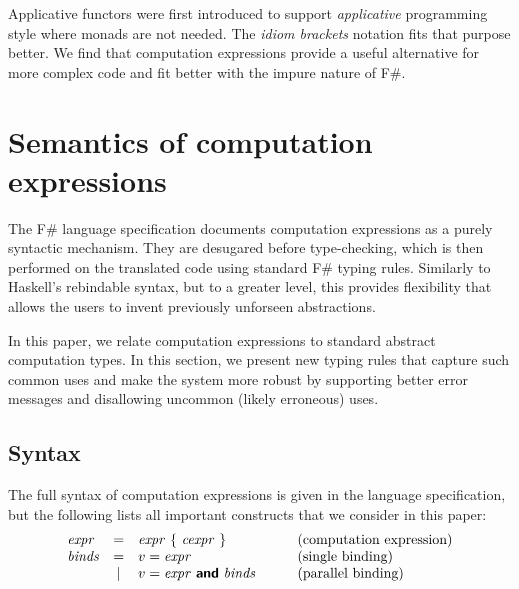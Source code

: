 \documentclass[runningheads,a4paper]{llncs}
\begin{document}
Applicative functors were first introduced to support \emph{applicative} programming style where
monads are not needed. The \emph{idiom brackets} notation \cite{applicative} fits that purpose better. We
find that computation expressions provide a useful alternative for more complex code and fit better 
with the impure nature of F\#.


\section{Semantics of computation expressions}
\label{sec:semantics}

The F\# language specification \cite{fsharp-spec} documents computation expressions as a purely syntactic 
mechanism. They are desugared before type-checking, which is then performed on the translated code 
using standard F\# typing rules. Similarly to Haskell's rebindable syntax, but to a greater level, 
this provides flexibility that allows the users to invent previously unforseen abstractions.

In this paper, we relate computation expressions to standard abstract computation types. In this
section, we present new typing rules that capture such common uses and make the system more robust 
by supporting better error messages and disallowing uncommon (likely erroneous) uses.


\subsection{Syntax}
\label{sec:semantics-syntax}

The full syntax of computation expressions is given in the language specification, but the following
lists all important constructs that we consider in this paper:
%
\begin{equation*}
\begin{array}{lclcl}
\expr  &=& \expr ~\{~ \cexpr ~\}                       &\quad&\textnormal{(computation expression)}\\
\binds &=& v=\expr                                          &&\textnormal{(single binding)}\\
       &|& v=\expr ~\kvd{and}~\binds                        &&\textnormal{(parallel binding)}\\
\end{array}
\end{equation*}
\end{document}
